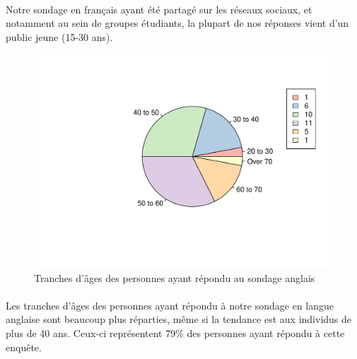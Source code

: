 \documentclass[12pt]{article}\usepackage[]{graphicx}\usepackage[]{color}
\makeatletter
\def\maxwidth{ %
  \ifdim\Gin@nat@width>\linewidth
    \linewidth
  \else
    \Gin@nat@width
  \fi
}
\newenvironment{knitrout}{}{} %
\makeatother
\begin{document}
\paragraph{} Notre sondage en français ayant été partagé sur les
réseaux sociaux, et notamment au sein de groupes étudiants, la plupart de nos
réponses vient d'un public jeune (15-30 ans).

\begin{knitrout}
\color{fgcolor}\begin{figure}[H]
\includegraphics[width=\maxwidth]{figure/tranche_age_en-1} \caption[Tranches d'âges des personnes ayant répondu au sondage anglais]{Tranches d'âges des personnes ayant répondu au sondage anglais}\label{fig:tranche age en}
\end{figure}


\end{knitrout}

\paragraph{} Les tranches d'âges des personnes ayant répondu à notre sondage
en langue anglaise sont beaucoup plus réparties, même si la tendance est aux
individus de plus de 40 ans. Ceux-ci représentent 79\% des personnes ayant
répondu à cette enquête.

%
%
%
%
%
\end{document}
